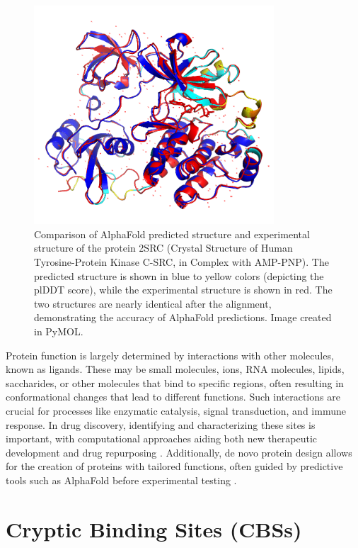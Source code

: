 \begin{figure}[ht]
    \centering
    \includegraphics[width=0.8\textwidth]{img/alphafold_vs_exp.png}
    \caption{Comparison of AlphaFold predicted structure and experimental structure of the protein 2SRC (Crystal Structure of Human Tyrosine-Protein Kinase C-SRC, in Complex with AMP-PNP). The predicted structure is shown in blue to yellow colors (depicting the plDDT score), while the experimental structure is shown in red. The two structures are nearly identical after the alignment, demonstrating the accuracy of AlphaFold predictions. Image created in PyMOL.}
    \label{fig:alphafold-vs-exp}
\end{figure}
\par

Protein function is largely determined by interactions with other molecules, known as ligands. These may be small molecules, ions, RNA molecules, lipids, saccharides, or other molecules that bind to specific regions, often resulting in conformational changes that lead to different functions. Such interactions are crucial for processes like enzymatic catalysis, signal transduction, and immune response. In drug discovery, identifying and characterizing these sites is important, with computational approaches aiding both new therapeutic development and drug repurposing \cite{konc2019binding}. Additionally, de novo protein design allows for the creation of proteins with tailored functions, often guided by predictive tools such as AlphaFold before experimental testing \cite{huang2016coming}.

\section{Cryptic Binding Sites (CBSs)}
\label{sec:binding-sites}

